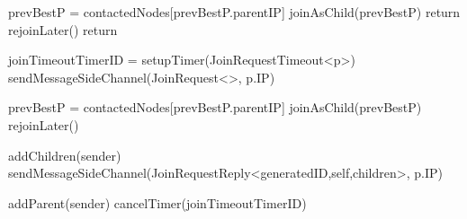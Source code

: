 \begin{algorithm}
\begin{algorithmic}[1]
     
        \State prevBestP = contactedNodes[prevBestP.parentIP]
        \State joinAsChild(prevBestP)       
        \State return
    \Else
        \State rejoinLater()
        \State return
    \EndIf
\asdend

    \State joinTimeoutTimerID = setupTimer(JoinRequestTimeout<p>)
    \State sendMessageSideChannel(JoinRequest<>, p.IP)
\asdend

        \State prevBestP = contactedNodes[prevBestP.parentIP]
        \State joinAsChild(prevBestP)
    \Else
        \State rejoinLater()
    \EndIf
\asdend

    \State addChildren(sender) 
    \State sendMessageSideChannel(JoinRequestReply<generatedID,self,children>, p.IP)
\asdend
    
    \State addParent(sender) 
    \State cancelTimer(joinTimeoutTimerID)
\asdend
\end{algorithmic}
\end{algorithm}
